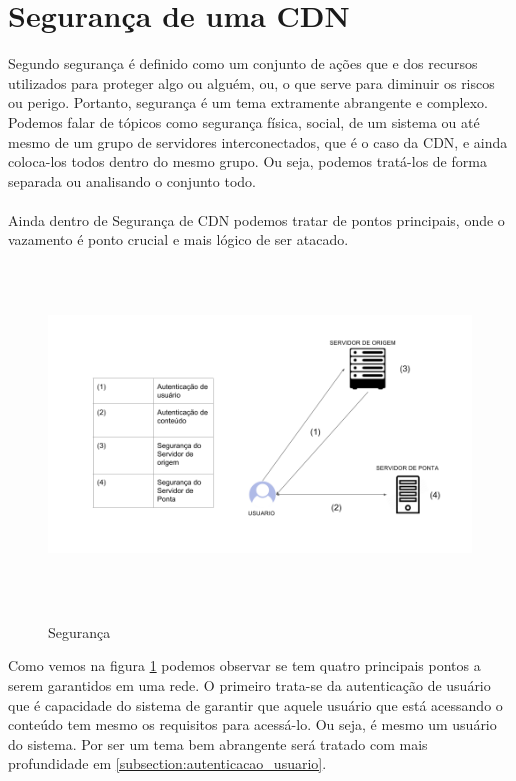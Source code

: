\section{Seguran\c{c}a de uma CDN} \label{sec:seguranca}
Segundo \cite{ferreira2004novo} seguran\c{c}a \'e definido como um conjunto de a\c{c}\~oes que e dos recursos utilizados para proteger algo ou algu\'em, ou, o que serve para diminuir os riscos ou perigo. Portanto, seguran\c{c}a \'e um tema extramente abrangente e complexo. Podemos falar de t\'opicos como seguran\c{c}a f\'isica, social, de um sistema ou at\'e mesmo de um grupo de servidores interconectados, que \'e o caso da CDN, e ainda coloca-los todos dentro do mesmo grupo. Ou seja, podemos trat\'a-los de forma separada ou analisando o conjunto todo.
\paragraph{} 
Ainda dentro de Seguran\c{c}a de CDN podemos tratar de pontos principais, onde o vazamento \'e ponto crucial e mais l\'ogico de ser atacado. 
\begin{figure}[H]
\caption{Seguran\c{c}a}
\includegraphics[height=9cm]{Figuras/seguranca_intro.png} 
\label{figura:seguranca_intro}
\end{figure}

Como vemos na figura \ref{figura:seguranca_intro} podemos observar se tem quatro principais pontos a serem garantidos em uma rede. O primeiro trata-se da autentica\c{c}\~ao de usu\'ario que \'e capacidade do sistema de garantir que aquele usu\'ario que est\'a acessando o conte\'udo tem mesmo os requisitos para acess\'a-lo. Ou seja, \'e mesmo um usu\'ario do sistema. Por ser um tema bem abrangente ser\'a tratado com mais profundidade em \ref{subsection:autenticacao_usuario}.
